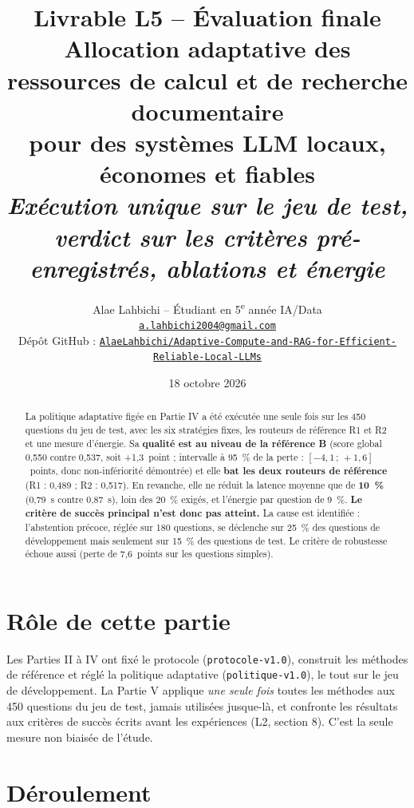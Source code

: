 \documentclass[11pt,a4paper]{article}
\title{\textbf{Livrable L5 -- Évaluation finale}\\[4pt]
\large Allocation adaptative des ressources de calcul et de recherche documentaire\\ pour des systèmes LLM locaux, économes et fiables\\[2pt]
\normalsize\textit{Exécution unique sur le jeu de test, verdict sur les critères pré-enregistrés, ablations et énergie}}
\author{Alae Lahbichi -- Étudiant en 5\textsuperscript{e} année IA/Data\\[2pt]
\small\href{mailto:a.lahbichi2004@gmail.com}{\texttt{a.lahbichi2004@gmail.com}}\\
\small Dépôt GitHub : \href{https://github.com/AlaeLahbichi/Adaptive-Compute-and-RAG-for-Efficient-Reliable-Local-LLMs}{\footnotesize\texttt{AlaeLahbichi/Adaptive-Compute-and-RAG-for-Efficient-Reliable-Local-LLMs}}}
\date{18 octobre 2026}
\begin{document}
\maketitle

\begin{abstract}
\noindent La politique adaptative figée en Partie IV a été exécutée une seule fois sur les 450 questions du jeu
de test, avec les six stratégies fixes, les routeurs de référence R1 et R2 et une mesure d'énergie. Sa
\textbf{qualité est au niveau de la référence B} (score global 0,550 contre 0,537, soit +1,3~point ;
intervalle à 95~\% de la perte : $[-4{,}1\,;\,+1{,}6]$~points, donc non-infériorité démontrée) et elle
\textbf{bat les deux routeurs de référence} (R1 : 0,489 ; R2 : 0,517). En revanche, elle ne réduit la
latence moyenne que de \textbf{10~\%} (0,79~s contre 0,87~s), loin des 20~\% exigés, et l'énergie par
question de 9~\%. \textbf{Le critère de succès principal n'est donc pas atteint.} La cause est
identifiée : l'abstention précoce, réglée sur 180 questions, se déclenche sur 25~\% des questions de
développement mais seulement sur 15~\% des questions de test. Le critère de robustesse échoue aussi
(perte de 7,6~points sur les questions simples).
\end{abstract}

\clearpage
\tableofcontents
\clearpage

\section{Rôle de cette partie}

Les Parties II à IV ont fixé le protocole (\texttt{protocole-v1.0}), construit les méthodes de référence
et réglé la politique adaptative (\texttt{politique-v1.0}), le tout sur le jeu de développement. La
Partie V applique \emph{une seule fois} toutes les méthodes aux 450 questions du jeu de test, jamais
utilisées jusque-là, et confronte les résultats aux critères de succès écrits avant les expériences
(L2, section 8). C'est la seule mesure non biaisée de l'étude.

\section{Déroulement}
\end{document}
